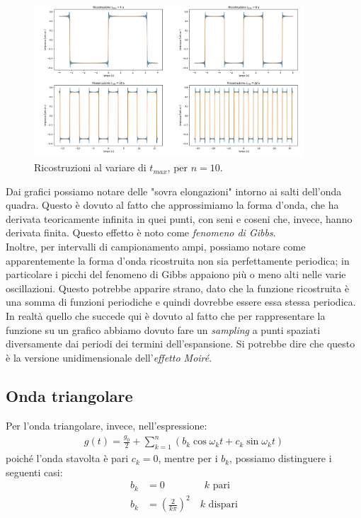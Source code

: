 \documentclass{article}[a4paper, oneside,11pt]
\begin{document}
        \begin{figure}[H]
            \centering
            \includegraphics[width=0.9\textwidth]{img/Ricostruzione_onda_quadra_campionamento.png}
            \caption{Ricostruzioni al variare di $t_{max}$, per $n=10$.}
            \label{Fig_OQC}
        \end{figure}
    \noindent Dai grafici possiamo notare delle "sovra elongazioni" intorno ai salti dell'onda quadra. Questo è dovuto al fatto che approssimiamo la forma d'onda, che ha derivata teoricamente infinita in quei punti, con seni e coseni che, invece, hanno derivata finita. Questo effetto è noto come \textit{fenomeno di Gibbs}.\\
    Inoltre, per intervalli di campionamento ampi, possiamo notare come apparentemente la forma d'onda ricostruita non sia perfettamente periodica; in particolare i picchi del fenomeno di Gibbs appaiono più o meno alti nelle varie oscillazioni. Questo potrebbe apparire strano, dato che la funzione ricostruita è una somma di funzioni periodiche e quindi dovrebbe essere essa stessa periodica. In realtà quello che succede qui è dovuto al fatto che per rappresentare la funzione su un grafico abbiamo dovuto fare un \textit{sampling} a punti spaziati diversamente dai periodi dei termini dell'espansione. Si potrebbe dire che questo è la versione unidimensionale dell'\textit{effetto Moiré}.\\
    
    
    \subsection{Onda triangolare}
    Per l'onda triangolare, invece, nell'espressione:
    \begin{align*}
        g(t) = \frac{g_0}{2} + \sum_{k=1}^{n} \left(b_k \cos{\omega_k t} + c_k \sin{\omega_k t} \right) 
    \end{align*}
    poiché l'onda stavolta è pari $c_k = 0$, mentre per i $b_k$, possiamo distinguere i seguenti casi: 
    \begin{align*}
        b_k &= 0 \qquad \qquad k \text{ pari}\\
        b_k &= \left(\frac{2}{k \pi}\right)^2 \quad k \text{ dispari}
    \end{align*}
    
\end{document}
